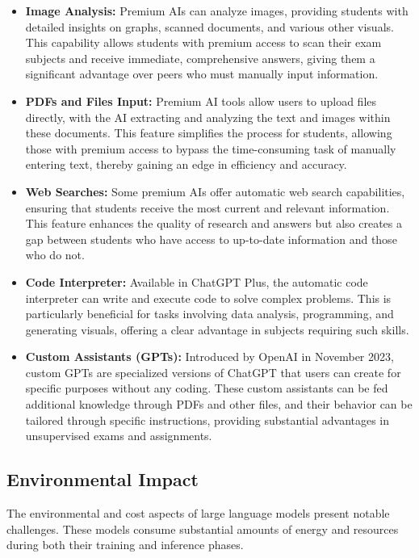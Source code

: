 \documentclass{article}
\begin{document}
\begin{itemize}
    \item \textbf{Image Analysis:} Premium AIs can analyze images, providing students with detailed insights on graphs, scanned documents, and various other visuals. This capability allows students with premium access to scan their exam subjects and receive immediate, comprehensive answers, giving them a significant advantage over peers who must manually input information.
    \item \textbf{PDFs and Files Input:} Premium AI tools allow users to upload files directly, with the AI extracting and analyzing the text and images within these documents. This feature simplifies the process for students, allowing those with premium access to bypass the time-consuming task of manually entering text, thereby gaining an edge in efficiency and accuracy.
    \item \textbf{Web Searches:} Some premium AIs offer automatic web search capabilities, ensuring that students receive the most current and relevant information. This feature enhances the quality of research and answers but also creates a gap between students who have access to up-to-date information and those who do not.
    \item \textbf{Code Interpreter:} Available in ChatGPT Plus, the automatic code interpreter can write and execute code to solve complex problems. This is particularly beneficial for tasks involving data analysis, programming, and generating visuals, offering a clear advantage in subjects requiring such skills.
    \item \textbf{Custom Assistants (GPTs):} Introduced by OpenAI in November 2023, custom GPTs are specialized versions of ChatGPT that users can create for specific purposes without any coding. These custom assistants can be fed additional knowledge through PDFs and other files, and their behavior can be tailored through specific instructions, providing substantial advantages in unsupervised exams and assignments.
\end{itemize}

\subsection{Environmental Impact}

The environmental and cost aspects of large language models
present notable challenges. These models consume substantial
amounts of energy and resources during both their training
and inference phases.
\end{document}
